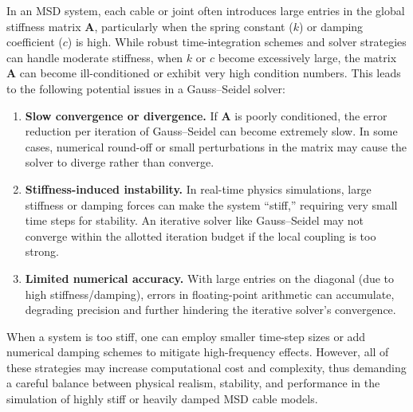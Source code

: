 \documentclass[12pt,twoside,letterpaper]{article}
\begin{document}
In an MSD system, each cable or joint often introduces large entries in the global stiffness matrix \(\mathbf{A}\), particularly when the spring constant (\(k\)) or damping coefficient (\(c\)) is high. While robust time-integration schemes and solver strategies can handle moderate stiffness, when \(k\) or \(c\) become excessively large, the matrix \(\mathbf{A}\) can become ill-conditioned or exhibit very high condition numbers. This leads to the following potential issues in a Gauss--Seidel solver:

\begin{enumerate}
  \item \textbf{Slow convergence or divergence.} If \(\mathbf{A}\) is poorly conditioned, the error reduction per iteration of Gauss--Seidel can become extremely slow. In some cases, numerical round-off or small perturbations in the matrix may cause the solver to diverge rather than converge.

  \item \textbf{Stiffness-induced instability.} In real-time physics simulations, large stiffness or damping forces can make the system ``stiff,'' requiring very small time steps for stability. An iterative solver like Gauss--Seidel may not converge within the allotted iteration budget if the local coupling is too strong.

  \item \textbf{Limited numerical accuracy.} With large entries on the diagonal (due to high stiffness/damping), errors in floating-point arithmetic can accumulate, degrading precision and further hindering the iterative solver's convergence.
\end{enumerate}

When a system is too stiff, one can employ smaller time-step sizes or add numerical damping schemes to mitigate high-frequency effects. However, all of these strategies may increase computational cost and complexity, thus demanding a careful balance between physical realism, stability, and performance in the simulation of highly stiff or heavily damped MSD cable models.
\end{document}
